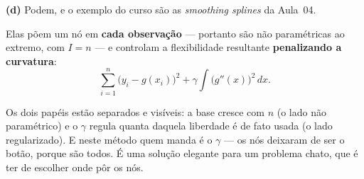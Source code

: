 \begin{solucao}
\smallskip
\textbf{(d)} Podem, e o exemplo do curso são as \emph{smoothing splines} da
Aula~04.

Elas põem um nó em \textbf{cada observação} --- portanto são não paramétricas ao
extremo, com $I=n$ --- e controlam a flexibilidade resultante \textbf{penalizando
a curvatura}:
\[
  \sum_{i=1}^n\big(y_i-g(x_i)\big)^2 + \gamma\int \big(g''(x)\big)^2\,dx .
\]

Os dois papéis estão separados e visíveis: a base cresce com $n$ (o lado não
paramétrico) e o $\gamma$ regula quanta daquela liberdade é de fato usada (o lado
regularizado). E neste método quem manda é o $\gamma$ --- os nós deixaram
de ser o botão, porque são todos. É uma solução elegante para um problema chato,
que é ter de escolher onde pôr os nós.
\end{solucao}
